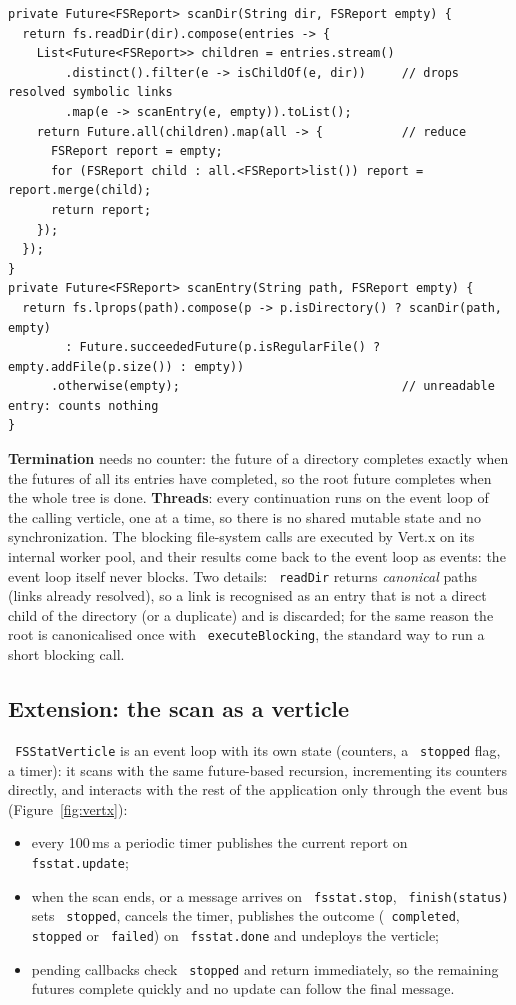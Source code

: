\documentclass[11pt,a4paper]{article}
\newcommand{\code}[1]{\texttt{\hyphenchar\font=-1 #1}}
\begin{document}
\begin{lstlisting}
private Future<FSReport> scanDir(String dir, FSReport empty) {
  return fs.readDir(dir).compose(entries -> {
    List<Future<FSReport>> children = entries.stream()
        .distinct().filter(e -> isChildOf(e, dir))     // drops resolved symbolic links
        .map(e -> scanEntry(e, empty)).toList();
    return Future.all(children).map(all -> {           // reduce
      FSReport report = empty;
      for (FSReport child : all.<FSReport>list()) report = report.merge(child);
      return report;
    });
  });
}
private Future<FSReport> scanEntry(String path, FSReport empty) {
  return fs.lprops(path).compose(p -> p.isDirectory() ? scanDir(path, empty)
        : Future.succeededFuture(p.isRegularFile() ? empty.addFile(p.size()) : empty))
      .otherwise(empty);                               // unreadable entry: counts nothing
}
\end{lstlisting}

\textbf{Termination} needs no counter: the future of a directory completes exactly when the futures
of all its entries have completed, so the root future completes when the whole tree is done.
\textbf{Threads}: every continuation runs on the event loop of the calling verticle, one at a time,
so there is no shared mutable state and no synchronization. The blocking file-system calls are
executed by Vert.x on its internal worker pool, and their results come back to the event loop as
events: the event loop itself never blocks. Two details: \code{readDir} returns
\emph{canonical} paths (links already resolved), so a link is recognised as an entry that is not a
direct child of the directory (or a duplicate) and is discarded; for the same reason the root is
canonicalised once with \code{executeBlocking}, the standard way to run a short blocking call.

\subsection{Extension: the scan as a verticle}

\code{FSStatVerticle} is an event loop with its own state (counters, a \code{stopped} flag, a timer):
it scans with the same future-based recursion, incrementing its counters directly, and interacts with
the rest of the application only through the event bus (Figure~\ref{fig:vertx}):


\begin{itemize}
  \item every 100\,ms a periodic timer publishes the current report on \code{fsstat.update};
  \item when the scan ends, or a message arrives on \code{fsstat.stop}, \code{finish(status)} sets
        \code{stopped}, cancels the timer, publishes the outcome (\code{completed}, \code{stopped} or
        \code{failed}) on \code{fsstat.done} and undeploys the verticle;
  \item pending callbacks check \code{stopped} and return immediately, so the remaining futures
        complete quickly and no update can follow the final message.
\end{itemize}
\end{document}
